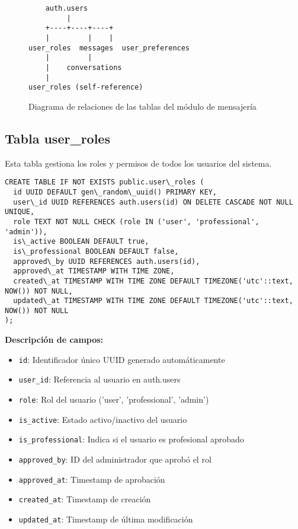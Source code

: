 \documentclass[12pt,a4paper]{article}
\begin{document}
\begin{figure}[h]
\centering
\begin{verbatim}
    auth.users
         |
    +----+----+----+
    |         |    |
user_roles  messages  user_preferences
    |         |
    |    conversations
    |
user_roles (self-reference)
\end{verbatim}
\caption{Diagrama de relaciones de las tablas del módulo de mensajería}
\end{figure}

\subsection{Tabla user\_roles}

Esta tabla gestiona los roles y permisos de todos los usuarios del sistema.

\begin{lstlisting}[caption=Estructura completa de user\_roles]
CREATE TABLE IF NOT EXISTS public.user\_roles (
  id UUID DEFAULT gen\_random\_uuid() PRIMARY KEY,
  user\_id UUID REFERENCES auth.users(id) ON DELETE CASCADE NOT NULL UNIQUE,
  role TEXT NOT NULL CHECK (role IN ('user', 'professional', 'admin')),
  is\_active BOOLEAN DEFAULT true,
  is\_professional BOOLEAN DEFAULT false,
  approved\_by UUID REFERENCES auth.users(id),
  approved\_at TIMESTAMP WITH TIME ZONE,
  created\_at TIMESTAMP WITH TIME ZONE DEFAULT TIMEZONE('utc'::text, NOW()) NOT NULL,
  updated\_at TIMESTAMP WITH TIME ZONE DEFAULT TIMEZONE('utc'::text, NOW()) NOT NULL
);
\end{lstlisting}

\textbf{Descripción de campos:}
\begin{itemize}
    \item \texttt{id}: Identificador único UUID generado automáticamente
    \item \texttt{user\_id}: Referencia al usuario en auth.users
    \item \texttt{role}: Rol del usuario ('user', 'professional', 'admin')
    \item \texttt{is\_active}: Estado activo/inactivo del usuario
    \item \texttt{is\_professional}: Indica si el usuario es profesional aprobado
    \item \texttt{approved\_by}: ID del administrador que aprobó el rol
    \item \texttt{approved\_at}: Timestamp de aprobación
    \item \texttt{created\_at}: Timestamp de creación
    \item \texttt{updated\_at}: Timestamp de última modificación
\end{itemize}
\end{document}
